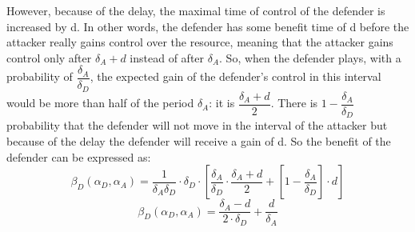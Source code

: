 However, because of the delay, the maximal time of control of the defender is increased by d. In other words, the defender has some benefit time of d before the attacker really gains control over the resource, meaning that the attacker gains control only after $\delta_{A}+d$ instead of after $\delta_{A}$. So, when the defender plays, with a probability of $\dfrac{\delta_{A} } {\delta_{D}} $, the expected gain of the defender's control in this interval would be more than half of the period $\delta_{A} $: it is $\dfrac{\delta_{A} + d}{2}$. There is $1- \dfrac{\delta_{A} } {\delta_{D}} $ probability that the defender will not move in the interval of the attacker but because of the delay the defender will receive a gain of d. So the benefit of the defender can be expressed as:
\begin{equation}\label{first}
\beta_{D}(\alpha_{D},\alpha_{A}) = \dfrac { 1} {\delta_{A} \delta_{D}} \cdot \delta_{D} \cdot [ \dfrac{\delta_{A} }{\delta_{D}} \cdot \dfrac{\delta_{A} + d}{2}+[ 1-\dfrac{\delta_{A}}{ \delta_{D}}] \cdot d ]
\end{equation}
\begin{equation}\label{first}
\beta_{D}(\alpha_{D},\alpha_{A}) = \dfrac {\delta_{A} - d}{2 \cdot \delta_{D}} + \dfrac{d}{\delta_{A}} 
\end{equation}



%
